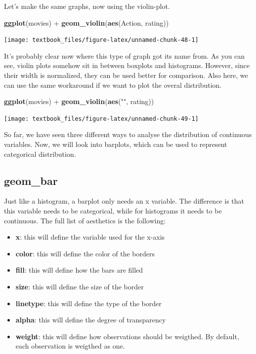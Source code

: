 \documentclass[]{tufte-book}
\newenvironment{Shaded}{}{}
\newcommand{\KeywordTok}[1]{\textcolor[rgb]{0.00,0.44,0.13}{\textbf{#1}}}
\newcommand{\NormalTok}[1]{#1}
\newcommand{\OperatorTok}[1]{\textcolor[rgb]{0.40,0.40,0.40}{#1}}
\newcommand{\StringTok}[1]{\textcolor[rgb]{0.25,0.44,0.63}{#1}}
\providecommand{\tightlist}{%
  \setlength{\itemsep}{0pt}\setlength{\parskip}{0pt}}
\begin{document}
Let's make the same graphs, now using the violin-plot.

\begin{Shaded}
\begin{Highlighting}[]
\KeywordTok{ggplot}\NormalTok{(movies) }\OperatorTok{+}\StringTok{ }
\StringTok{    }\KeywordTok{geom_violin}\NormalTok{(}\KeywordTok{aes}\NormalTok{(Action, rating))}
\end{Highlighting}
\end{Shaded}

\texttt{[image: textbook\_files/figure-latex/unnamed-chunk-48-1]}

It's probably clear now where this type of graph got its name from. As you can see, violin plots somehow sit in between boxplots and histograms. However, since their width is normalized, they can be used better for comparison. Also here, we can use the same workaround if we want to plot the overal distribution.

\begin{Shaded}
\begin{Highlighting}[]
\KeywordTok{ggplot}\NormalTok{(movies) }\OperatorTok{+}
\StringTok{    }\KeywordTok{geom_violin}\NormalTok{(}\KeywordTok{aes}\NormalTok{(}\StringTok{""}\NormalTok{, rating))}
\end{Highlighting}
\end{Shaded}

\texttt{[image: textbook\_files/figure-latex/unnamed-chunk-49-1]}

So far, we have seen three different ways to analyse the distribution of continuous variables. Now, we will look into barplots, which can be used to represent categorical distribution.

\hypertarget{geom_bar}{%
\subsection{geom\_bar}\label{geom_bar}}

Just like a histogram, a barplot only needs an x variable. The difference is that this variable needs to be categorical, while for histograms it needs to be continuous. The full list of aesthetics is the following:

\begin{itemize}
\tightlist
\item
  \textbf{x}: this will define the variable used for the x-axis
\item
  \textbf{color}: this will define the color of the borders
\item
  \textbf{fill}: this will define how the bars are filled
\item
  \textbf{size}: this will define the size of the border
\item
  \textbf{linetype}: this will define the type of the border
\item
  \textbf{alpha}: this will define the degree of transparency
\item
  \textbf{weight}: this will define how observations should be weigthed. By default, each observation is weigthed as one.
\end{itemize}
\end{document}
